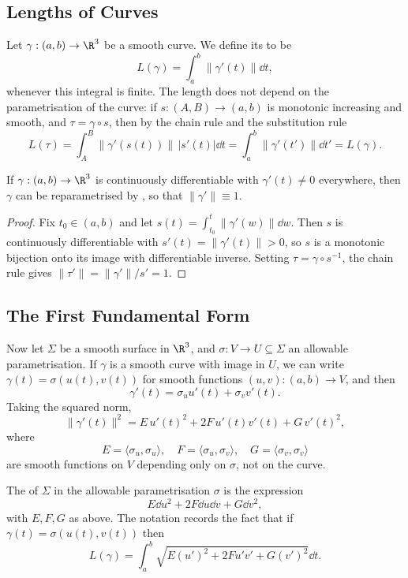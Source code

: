 \subsection{Lengths of Curves}

Let $\gamma: (a, b) \rightarrow \R^3$ be a smooth curve. We define its  to be
$$
L(\gamma) = \int_a^b \|\gamma'(t)\| \dd t,
$$
whenever this integral is finite. The length does not depend on the parametrisation of the curve: if $s: (A, B) \rightarrow (a, b)$ is monotonic increasing and smooth, and $\tau = \gamma \circ s$, then by the chain rule and the substitution rule
$$
L(\tau) = \int_A^B \|\gamma'(s(t))\| \, |s'(t)| \dd t = \int_a^b \|\gamma'(t')\| \dd t' = L(\gamma).
$$

\begin{lemma}
    If $\gamma: (a, b) \rightarrow \R^3$ is continuously differentiable with $\gamma'(t) \neq 0$ everywhere, then $\gamma$ can be reparametrised by , so that $\|\gamma'\| \equiv 1$.
\end{lemma}
\begin{proof}
    Fix $t_0 \in (a,b)$ and let $s(t) = \int_{t_0}^t \|\gamma'(w)\|\dd w$. Then $s$ is continuously differentiable with $s'(t) = \|\gamma'(t)\| > 0$, so $s$ is a monotonic bijection onto its image with differentiable inverse. Setting $\tau = \gamma \circ s^{-1}$, the chain rule gives $\|\tau'\| = \|\gamma'\| / s' = 1$.
\end{proof}

\subsection{The First Fundamental Form}

Now let $\Sigma$ be a smooth surface in $\R^3$, and $\sigma: V \rightarrow U \subseteq \Sigma$ an allowable parametrisation. If $\gamma$ is a smooth curve with image in $U$, we can write $\gamma(t) = \sigma(u(t), v(t))$ for smooth functions $(u, v): (a,b) \rightarrow V$, and then
$$
\gamma'(t) = \sigma_u u'(t) + \sigma_v v'(t).
$$
Taking the squared norm,
$$
\|\gamma'(t)\|^2 = E \, u'(t)^2 + 2F\, u'(t) v'(t) + G \, v'(t)^2,
$$
where
$$
E = \langle \sigma_u, \sigma_u \rangle, \quad F = \langle \sigma_u, \sigma_v \rangle, \quad G = \langle \sigma_v, \sigma_v \rangle
$$
are smooth functions on $V$ depending only on $\sigma$, not on the curve.

\begin{definition}
    The  of $\Sigma$ in the allowable parametrisation $\sigma$ is the expression
    $$
    E \dd u^2 + 2F \dd u \dd v + G \dd v^2,
    $$
    with $E, F, G$ as above. The notation records the fact that if $\gamma(t) = \sigma(u(t), v(t))$ then
    $$
    L(\gamma) = \int_a^b \sqrt{E (u')^2 + 2 F u' v' + G (v')^2} \dd t.
    $$
\end{definition}

